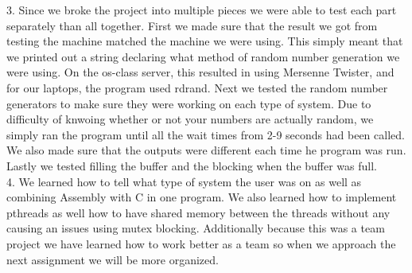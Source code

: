 \documentclass[letterpaper,10pt,titlepage]{article}
\begin{document}
    3. Since we broke the project into multiple pieces we were able to test each part separately than all together. First we made sure that the result we got from testing the machine matched the machine we were using. This simply meant that we printed out a string declaring what method of random number generation we were using. On the os-class server, this resulted in using Mersenne Twister, and for our laptops, the program used rdrand. Next we tested the random number generators to make sure they were working on each type of system. Due to difficulty of knwoing whether or not your numbers are actually random, we simply ran the program until all the wait times from 2-9 seconds had been called. We also made sure that the outputs were different each time he program was run. Lastly we tested filling the buffer and the blocking when the buffer was full.\\

    4. We learned how to tell what type of system the user was on as well as combining Assembly with C in one program. We also learned how to implement pthreads as well how to have shared memory between the threads without any causing an issues using mutex blocking. Additionally because this was a team project we have learned how to work better as a team so when we approach the next assignment we will be more organized.\\ 
\end{document}
